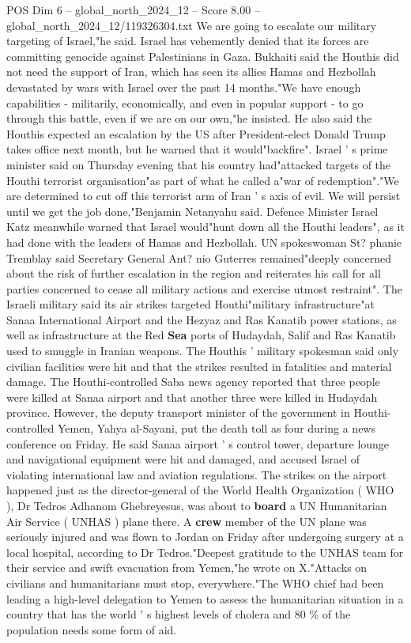 \begin{textsample}{POS Dim 6 – global\_north\_2024\_12 – Score 8.00 – global\_north\_2024\_12/119326304.txt}
We are going to escalate our military targeting of Israel,"he said.
Israel has vehemently denied that its forces are committing genocide against Palestinians in Gaza.
Bukhaiti said the Houthis did not need the support of Iran, which has seen its allies Hamas and Hezbollah devastated by wars with Israel over the past 14 months."We have enough capabilities - militarily, economically, and even in popular support - to go through this battle, even if we are on our own,"he insisted.
He also said the Houthis expected an escalation by the US after President-elect Donald Trump takes office next month, but he warned that it would"backfire".
Israel ' s prime minister said on Thursday evening that his country had"attacked targets of the Houthi terrorist organisation"as part of what he called a"war of redemption"."We are determined to cut off this terrorist arm of Iran ' s axis of evil.
We will persist until we get the job done,"Benjamin Netanyahu said.
Defence Minister Israel Katz meanwhile warned that Israel would"hunt down all the Houthi leaders", as it had done with the leaders of Hamas and Hezbollah.
UN spokeswoman St? phanie Tremblay said Secretary General Ant? nio Guterres remained"deeply concerned about the risk of further escalation in the region and reiterates his call for all parties concerned to cease all military actions and exercise utmost restraint".
The Israeli military said its air strikes targeted Houthi"military infrastructure"at Sanaa International Airport and the Hezyaz and Ras Kanatib power stations, as well as infrastructure at the Red \textbf{Sea} ports of Hudaydah, Salif and Ras Kanatib used to smuggle in Iranian weapons.
The Houthis ' military spokesman said only civilian facilities were hit and that the strikes resulted in fatalities and material damage.
The Houthi-controlled Saba news agency reported that three people were killed at Sanaa airport and that another three were killed in Hudaydah province.
However, the deputy transport minister of the government in Houthi-controlled Yemen, Yahya al-Sayani, put the death toll as four during a news conference on Friday.
He said Sanaa airport ' s control tower, departure lounge and navigational equipment were hit and damaged, and accused Israel of violating international law and aviation regulations.
The strikes on the airport happened just as the director-general of the World Health Organization ( WHO ), Dr Tedros Adhanom Ghebreyesus, was about to \textbf{board} a UN Humanitarian Air Service ( UNHAS ) plane there.
A \textbf{crew} member of the UN plane was seriously injured and was flown to Jordan on Friday after undergoing surgery at a local hospital, according to Dr Tedros."Deepest gratitude to the UNHAS team for their service and swift evacuation from Yemen,"he wrote on X."Attacks on civilians and humanitarians must stop, everywhere."The WHO chief had been leading a high-level delegation to Yemen to assess the humanitarian situation in a country that has the world ' s highest levels of cholera and 80 \% of the population needs some form of aid.

\end{textsample}
